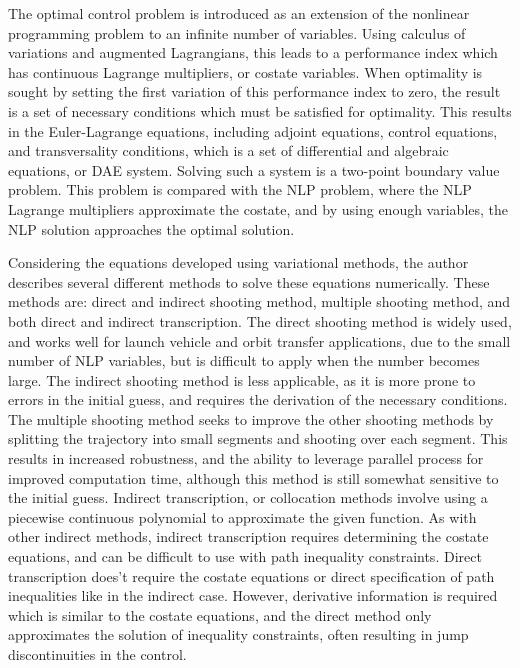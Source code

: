 \documentclass[11pt,letterpaper,onecolumn,notitlepage]{article}
\begin{document}
The optimal control problem is introduced as an extension of the nonlinear programming problem to an infinite number of variables.
Using calculus of variations and augmented Lagrangians, this leads to a performance index which has continuous Lagrange multipliers, or costate variables.
When optimality is sought by setting the first variation of this performance index to zero, the result is a set of necessary conditions which must be satisfied for optimality.
This results in the Euler-Lagrange equations, including adjoint equations, control equations, and transversality conditions, which is a set of differential and algebraic equations, or DAE system.
Solving such a system is a two-point boundary value problem.
This problem is compared with the NLP problem, where the NLP Lagrange multipliers approximate the costate, and by using enough variables, the NLP solution approaches the optimal solution.

Considering the equations developed using variational methods, the author describes several different methods to solve these equations numerically.
These methods are: direct and indirect shooting method, multiple shooting method, and both direct and indirect transcription.
The direct shooting method is widely used, and works well for launch vehicle and orbit transfer applications, due to the small number of NLP variables, but is difficult to apply when the number becomes large.
The indirect shooting method is less applicable, as it is more prone to errors in the initial guess, and requires the derivation of the necessary conditions.
The multiple shooting method seeks to improve the other shooting methods by splitting the trajectory into small segments and shooting over each segment.
This results in increased robustness, and the ability to leverage parallel process for improved computation time, although this method is still somewhat sensitive to the initial guess.
Indirect transcription, or collocation methods involve using a piecewise continuous polynomial to approximate the given function.
As with other indirect methods, indirect transcription requires determining the costate equations, and can be difficult to use with path inequality constraints.
Direct transcription does't require the costate equations or direct specification of path inequalities like in the indirect case.
However, derivative information is required which is similar to the costate equations, and the direct method only approximates the solution of inequality constraints, often resulting in jump discontinuities in the control.
\end{document}
